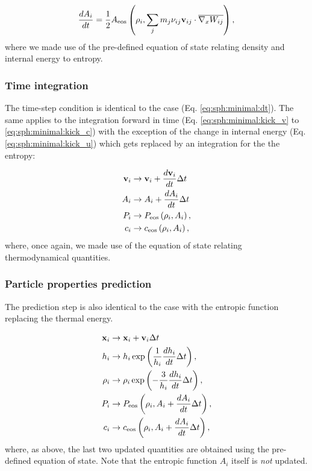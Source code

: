 \begin{equation}
\frac{dA_i}{dt} = \frac{1}{2} A_{\rm eos}\left(\rho_i, \sum_j
m_j \nu_{ij}\vec{v}_{ij}\cdot \Wij\right),
\end{equation}
where we made use of the pre-defined equation of state relating
density and internal energy to entropy.

\subsubsection{Time integration}

The time-step condition is identical to the \MinimalSPH case
(Eq. \ref{eq:sph:minimal:dt}). The same applies to the integration
forward in time (Eq. \ref{eq:sph:minimal:kick_v} to
\ref{eq:sph:minimal:kick_c}) with the exception of the change in
internal energy (Eq. \ref{eq:sph:minimal:kick_u}) which gets replaced
by an integration for the the entropy:


\begin{align}
  \vec{v}_i &\rightarrow \vec{v}_i + \frac{d\vec{v}_i}{dt} \Delta t  \label{eq:sph:gadget2:kick_v}\\
  A_i &\rightarrow A_i + \frac{dA_i}{dt} \Delta t \label{eq:sph:gadget2:kick_A}\\
  P_i &\rightarrow P_{\rm eos}\left(\rho_i, A_i\right) \label{eq:sph:gadget2:kick_P}, \\
  c_i &\rightarrow c_{\rm eos}\left(\rho_i, A_i\right) \label{eq:sph:gadget2:kick_c},
\end{align}
where, once again, we made use of the equation of state relating
thermodynamical quantities.

\subsubsection{Particle properties prediction}

The prediction step is also identical to the \MinimalSPH case with the
entropic function replacing the thermal energy.

\begin{align}
  \vec{x}_i &\rightarrow \vec{x}_i + \vec{v}_i \Delta t  \label{eq:sph:gadget2:drift_x} \\
  h_i &\rightarrow h_i \exp\left(\frac{1}{h_i} \frac{dh_i}{dt}
  \Delta t\right), \label{eq:sph:gadget2:drift_h}\\
  \rho_i &\rightarrow \rho_i \exp\left(-\frac{3}{h_i} \frac{dh_i}{dt}
  \Delta t\right), \label{eq:sph:gadget2:drift_rho} \\
  P_i &\rightarrow P_{\rm eos}\left(\rho_i, A_i + \frac{dA_i}{dt} \Delta t\right), \label{eq:sph:gadget2:drift_P}\\
  c_i &\rightarrow c_{\rm eos}\left(\rho_i, A_i + \frac{dA_i}{dt}
  \Delta t\right) \label{eq:sph:gadget2:drift_c},
\end{align}
where, as above, the last two updated quantities are obtained using
the pre-defined equation of state. Note that the entropic function $A_i$
itself is \emph{not} updated.

